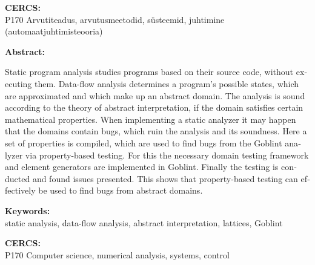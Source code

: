\documentclass[../thesis.tex]{subfiles}
\begin{document}
\noindent\textbf{CERCS:}\\
P170 Arvutiteadus, arvutusmeetodid, süsteemid, juhtimine (automaatjuhtimisteooria)

\vspace*{1ex}



\begin{otherlanguage}{english}

\noindent\textbf{\large \mytitle}

\vspace*{1ex}

\noindent\textbf{Abstract:}

\noindent
Static program analysis studies programs based on their source code, without executing them.
Data-flow analysis determines a program's possible states, which are approximated and which make up an abstract domain. The analysis is sound according to the theory of abstract interpretation, if the domain satisfies certain mathematical properties.
When implementing a static analyzer it may happen that the domains contain bugs, which ruin the analysis and its soundness.
Here a set of properties is compiled, which are used to find bugs from the Goblint analyzer via property-based testing.
For this the necessary domain testing framework and element generators are implemented in Goblint. Finally the testing is conducted and found issues presented.
This shows that property-based testing can effectively be used to find bugs from abstract domains.

\vspace*{1ex}

\noindent\textbf{Keywords:}\\
static analysis, data-flow analysis, abstract interpretation, lattices, Goblint

\vspace*{1ex}

\noindent\textbf{CERCS:}\\
P170 Computer science, numerical analysis, systems, control

\vspace*{1ex}

\end{otherlanguage} %
\end{document}

